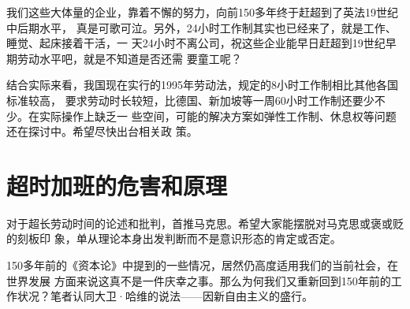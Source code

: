 我们这些大体量的企业，靠着不懈的努力，向前150多年终于赶超到了英法19世纪中后期水平，
真是可歌可泣。另外，24小时工作制其实也已经来了，就是工作、睡觉、起床接着干活，一
天24小时不离公司，祝这些企业能早日赶超到19世纪早期劳动水平吧，就是不知道是否还需
要童工呢？

结合实际来看，我国现在实行的1995年劳动法，规定的8小时工作制相比其他各国标准较高，
要求劳动时长较短，比德国、新加坡等一周60小时工作制还要少不少。在实际操作上缺乏一
些空间，可能的解决方案如弹性工作制、休息权等问题还在探讨中。希望尽快出台相关政
策。

\section{超时加班的危害和原理}
\label{sec:gzryuanli}

对于超长劳动时间的论述和批判，首推马克思。希望大家能摆脱对马克思或褒或贬的刻板印
象，单从理论本身出发判断而不是意识形态的肯定或否定。

150多年前的《资本论》中提到的一些情况，居然仍高度适用我们的当前社会，在世界发展
方面来说这真不是一件庆幸之事。那么为何我们又重新回到150年前的工作状况？笔者认同大卫·哈维的说法——因新自由主义的盛行。

